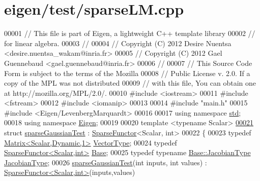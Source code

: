 \hypertarget{eigen_2test_2sparse_l_m_8cpp_source}{}\section{eigen/test/sparse\+LM.cpp}
\label{eigen_2test_2sparse_l_m_8cpp_source}

\begin{DoxyCode}
00001 \textcolor{comment}{// This file is part of Eigen, a lightweight C++ template library}
00002 \textcolor{comment}{// for linear algebra.}
00003 \textcolor{comment}{//}
00004 \textcolor{comment}{// Copyright (C) 2012 Desire Nuentsa <desire.nuentsa\_wakam@inria.fr>}
00005 \textcolor{comment}{// Copyright (C) 2012 Gael Guennebaud <gael.guennebaud@inria.fr>}
00006 \textcolor{comment}{//}
00007 \textcolor{comment}{// This Source Code Form is subject to the terms of the Mozilla}
00008 \textcolor{comment}{// Public License v. 2.0. If a copy of the MPL was not distributed}
00009 \textcolor{comment}{// with this file, You can obtain one at http://mozilla.org/MPL/2.0/.}
00010 \textcolor{preprocessor}{#include <iostream>}
00011 \textcolor{preprocessor}{#include <fstream>}
00012 \textcolor{preprocessor}{#include <iomanip>}
00013 
00014 \textcolor{preprocessor}{#include "main.h"}
00015 \textcolor{preprocessor}{#include <Eigen/LevenbergMarquardt>}
00016 
00017 \textcolor{keyword}{using namespace }\hyperlink{namespacestd}{std};
00018 \textcolor{keyword}{using namespace }\hyperlink{namespace_eigen}{Eigen};
00019 
00020 \textcolor{keyword}{template} <\textcolor{keyword}{typename} Scalar>
\hyperlink{structsparse_gaussian_test}{00021} \textcolor{keyword}{struct }\hyperlink{structsparse_gaussian_test}{sparseGaussianTest} : \hyperlink{struct_eigen_1_1_sparse_functor}{SparseFunctor}<Scalar, int>
00022 \{
00023   \textcolor{keyword}{typedef} \hyperlink{group___core___module}{Matrix<Scalar,Dynamic,1>} \hyperlink{group___core___module}{VectorType};
00024   \textcolor{keyword}{typedef} \hyperlink{struct_eigen_1_1_sparse_functor}{SparseFunctor<Scalar,int>} \hyperlink{struct_eigen_1_1_sparse_functor}{Base};
00025   \textcolor{keyword}{typedef} \textcolor{keyword}{typename} \hyperlink{group___sparse_core___module_class_eigen_1_1_sparse_matrix}{Base::JacobianType} \hyperlink{group___sparse_core___module_class_eigen_1_1_sparse_matrix}{JacobianType};
00026   \hyperlink{structsparse_gaussian_test}{sparseGaussianTest}(\textcolor{keywordtype}{int} inputs, \textcolor{keywordtype}{int} values) : 
      \hyperlink{struct_eigen_1_1_sparse_functor}{SparseFunctor<Scalar,int>}(inputs,values)

\end{DoxyCode}
